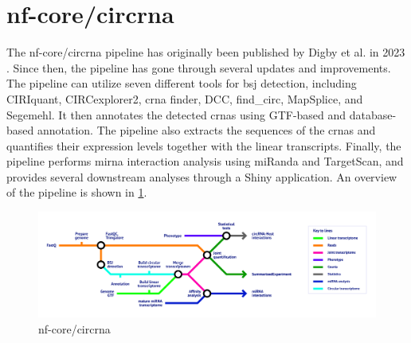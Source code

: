 \section{nf-core/circrna}
\label{sec:nf-core_circrna}
The nf-core/circrna pipeline has originally been published by Digby et al.
in
2023 \supercite{digby_nf-corecircrna_2023}.
Since then, the pipeline has gone through several updates and improvements.
The pipeline can utilize seven different tools for \gls{bsj} detection,
including CIRIquant, CIRCexplorer2, \gls{crna} finder, DCC, find\_circ,
MapSplice, and Segemehl.
It then annotates the detected \gls{crna}s using GTF-based and database-based
annotation.
The pipeline also extracts the sequences of the \gls{crna}s and quantifies
their expression levels together with the linear transcripts.
Finally, the pipeline performs \gls{mirna} interaction analysis using miRanda and
TargetScan, and provides several downstream analyses through a Shiny
application.
An overview of the pipeline is shown in \cref{fig:circrna_pipeline}.

\begin{figure}[ht]
    \centering

    \includegraphics[width=\textwidth]{chapters/3_materials_and_methods/figures/nf-core_circrna.png}
    \caption{nf-core/circrna} %
    \label{fig:circrna_pipeline}
\end{figure}






